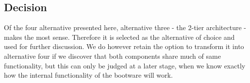 \subsection{Decision}

Of the four alternative presented here, alternative three - the 2-tier architecture - makes the most sense.
Therefore it is selected as the alternative of choice and used for further discussion.
We do however retain the option to transform it into alternative four if we discover that both components share much of same functionality, but this can only be judged at a later stage, when we know exactly how the internal functionality of the bootware will work.
